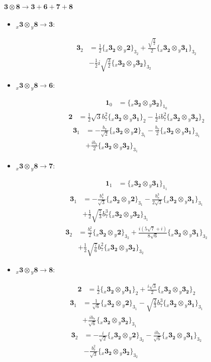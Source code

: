 \documentclass[english]{article}
\newcommand{\cgEqFontsize}{\large}
\newcommand{\rep}[1]{\mathbf{#1}}
\newcommand{\repx}[2]{{}_{#2}\mathbf{#1}}
\newcommand{\tsprod}[2]{\rep{#1}\otimes\rep{#2}}
\newcommand{\tsprodx}[2]{\repx{#1}{x}\otimes\repx{#2}{y}}
\newcommand{\subcgs}[3]{\big\{ \tsprodx{#1}{#2}\big\}^{}_{#3}}
\newcommand{\bfl}{\begin{fleqn}[25pt]}
\newcommand{\efl}{\end{fleqn}}
\begin{document}
\paragraph*{\cgEqFontsize $\tsprod{3}{8}\to\rep{3}+\rep{6}+\rep{7}+\rep{8}$}
\begin{itemize}
\item $\tsprodx{3}{8}\to\rep{3}$:
\bfl
\begin{align*}
\rep{3}_{2} & = \frac{1}{2}\subcgs{3_{2}}{2}{3_{2}}+\frac{\sqrt{\frac{3}{2}}}{2}\subcgs{3_{2}}{3_{1}}{3_{2}} \\ 
 & -\frac{1}{2} i \sqrt{\frac{3}{2}}\subcgs{3_{2}}{3_{2}}{3_{2}}
\end{align*}
\efl
\item $\tsprodx{3}{8}\to\rep{6}$:
\bfl
\begin{align*}
\rep{1}_{0} & = \subcgs{3_{2}}{3_{2}}{1_{0}}
\end{align*}
\begin{align*}
\rep{2} & = \frac{1}{2} \sqrt{3} b_7^2\subcgs{3_{2}}{3_{1}}{2}-\frac{1}{2} i b_7^2\subcgs{3_{2}}{3_{2}}{2}
\end{align*}
\begin{align*}
\rep{3}_{1} & = -\frac{b_7}{\sqrt{2}}\subcgs{3_{2}}{2}{3_{1}}-\frac{b_7}{2}\subcgs{3_{2}}{3_{1}}{3_{1}} \\ 
 & +\frac{i b_7}{2}\subcgs{3_{2}}{3_{2}}{3_{1}}
\end{align*}
\efl
\item $\tsprodx{3}{8}\to\rep{7}$:
\bfl
\begin{align*}
\rep{1}_{1} & = \subcgs{3_{2}}{3_{1}}{1_{1}}
\end{align*}
\begin{align*}
\rep{3}_{1} & = -\frac{b_7^4}{\sqrt{3}}\subcgs{3_{2}}{2}{3_{1}}-\frac{b_7^3}{2 \sqrt{3}}\subcgs{3_{2}}{3_{1}}{3_{1}} \\ 
 & +\frac{1}{2} \sqrt{\frac{7}{3}} b_7^3\subcgs{3_{2}}{3_{2}}{3_{1}}
\end{align*}
\begin{align*}
\rep{3}_{2} & = \frac{b_7^2}{2}\subcgs{3_{2}}{2}{3_{2}}+\frac{i \left(5 \sqrt{7}+i\right)}{8 \sqrt{6}}\subcgs{3_{2}}{3_{1}}{3_{2}} \\ 
 & +\frac{1}{2} \sqrt{\frac{7}{6}} b_7^2\subcgs{3_{2}}{3_{2}}{3_{2}}
\end{align*}
\efl
\item $\tsprodx{3}{8}\to\rep{8}$:
\bfl
\begin{align*}
\rep{2} & = \frac{1}{2}\subcgs{3_{2}}{3_{1}}{2}+\frac{i \sqrt{3}}{2}\subcgs{3_{2}}{3_{2}}{2}
\end{align*}
\begin{align*}
\rep{3}_{1} & = \frac{1}{\sqrt{6}}\subcgs{3_{2}}{2}{3_{1}}-\sqrt{\frac{2}{3}} b_7^3\subcgs{3_{2}}{3_{1}}{3_{1}} \\ 
 & +\frac{i b_7}{\sqrt{6}}\subcgs{3_{2}}{3_{2}}{3_{1}}
\end{align*}
\begin{align*}
\rep{3}_{2} & = -\frac{i}{\sqrt{2}}\subcgs{3_{2}}{2}{3_{2}}-\frac{i b_7}{\sqrt{6}}\subcgs{3_{2}}{3_{1}}{3_{2}} \\ 
 & -\frac{b_7^2}{\sqrt{3}}\subcgs{3_{2}}{3_{2}}{3_{2}}
\end{align*}
\efl
\end{itemize}
\end{document}
